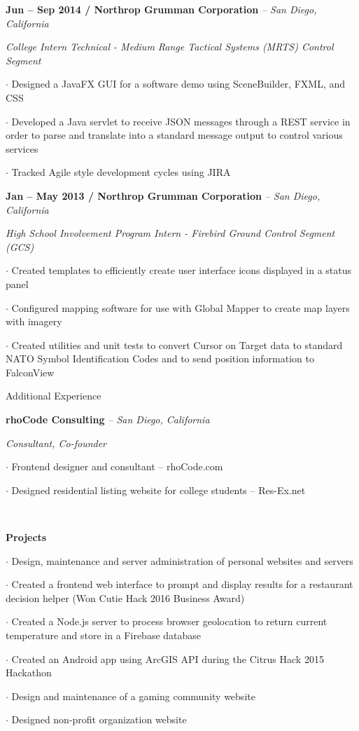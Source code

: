 \documentclass{article}
\newcommand{\entry}[5]{%
	{\fontsize{11pt}{11pt}  }%
	\parbox[t]{16cm}{%
		
		\fontsize{11pt}{11pt}\textbf{#1 / #2}%
		{\footnotesize\emph{ -- #3}}%

	}

	\parbox[t]{15cm}{
		\parbox{0.5cm}{ \: }
		{\fontsize{11pt}{11pt}%
			\emph{#4}%
		}
		
		\parbox{1cm}{\: }
		\parbox[t]{16cm}{
			\hangparas{0.5cm}{1}
			\fontsize{11pt}{11pt}	#5%
		}
	}
	\vspace{0.1cm}%
}
\newcommand{\entrysmall}[4]{%
	{\fontsize{11pt}{11pt} }%
	\parbox[t]{16cm}{%
		\fontsize{11pt}{11pt}\textbf{#1}%
		{\footnotesize\emph{-- #2}}%

		\parbox{0.5cm}{ \: }{
			\emph{#3}%
		}
		
		\parbox{0.5cm}{ \: }%
		\parbox[t]{16cm}{
			\hangparas{0.5cm}{1}	#4%
		}
	}
	\\\vspace{0.1cm}%
}
\newcommand{\additional}[2]{%
	{\fontsize{11pt}{11pt} }%
	\parbox[t]{16.5cm}{%
		\textbf{#1}%
		
		\parbox{0.5cm}{ \: }
		\parbox[t]{16.5cm}{	
			\hangparas{0.5cm}{1}	#2%
		}
	}
	\\\vspace{0.1cm}%
}
\renewcommand{\section}[1]{
	\par
	{%
		\fontsize{13pt}{12pt}\fontseries{b}\selectfont
		{#1}
	}
	\par\vspace{0.1cm}%
}
\begin{document}
\entry
{Jun -- Sep 2014}
{Northrop Grumman Corporation}
{San Diego, California}
{College Intern Technical - Medium Range Tactical Systems (MRTS) Control Segment}
{
	$\cdot$ Designed a JavaFX GUI for a software demo using SceneBuilder, FXML, and CSS
	
	$\cdot$ Developed a Java servlet to receive JSON messages through a REST service in order to parse and translate into a standard message output to control various services
	
	$\cdot$ Tracked Agile style development cycles using JIRA
}

\entry
{Jan -- May 2013}
{Northrop Grumman Corporation}
{San Diego, California}
{High School Involvement Program Intern - Firebird Ground Control Segment (GCS)}
{
	$\cdot$ Created templates to efficiently create user interface icons displayed in a status panel

	$\cdot$ Configured mapping software for use with Global Mapper to create map layers with imagery

	$\cdot$ Created utilities and unit tests to convert Cursor on Target data to standard NATO Symbol Identification Codes and to send position information to FalconView
}


\section{Additional Experience}

\entrysmall
{rhoCode Consulting}
{San Diego, California}
{Consultant, Co-founder}
{
	$\cdot$ Frontend designer and consultant -- rhoCode.com

	$\cdot$ Designed residential listing website for college students -- Res-Ex.net
}

\additional
{Projects}
{%
	$\cdot$ Design, maintenance and server administration of personal websites and servers

	$\cdot$ Created a frontend web interface to prompt and display results for a restaurant decision helper (Won Cutie Hack 2016 Business Award)

	$\cdot$ Created a Node.js server to process browser geolocation to return current temperature and store in a Firebase database

	$\cdot$ Created an Android app using ArcGIS API during the Citrus Hack 2015 Hackathon

	$\cdot$ Design and maintenance of a gaming community website

	$\cdot$ Designed non-profit organization website

}
\end{document}

